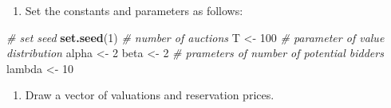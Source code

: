 \documentclass[
]{book}
\newenvironment{Shaded}{\begin{snugshade}}{\end{snugshade}}
\newcommand{\CommentTok}[1]{\textcolor[rgb]{0.56,0.35,0.01}{\textit{#1}}}
\newcommand{\DecValTok}[1]{\textcolor[rgb]{0.00,0.00,0.81}{#1}}
\newcommand{\FunctionTok}[1]{\textcolor[rgb]{0.13,0.29,0.53}{\textbf{#1}}}
\newcommand{\NormalTok}[1]{#1}
\newcommand{\OtherTok}[1]{\textcolor[rgb]{0.56,0.35,0.01}{#1}}
\providecommand{\tightlist}{%
  \setlength{\itemsep}{0pt}\setlength{\parskip}{0pt}}
\begin{document}
\begin{enumerate}
\def\labelenumi{\arabic{enumi}.}
\tightlist
\item
  Set the constants and parameters as follows:
\end{enumerate}

\begin{Shaded}
\begin{Highlighting}[]
\CommentTok{\# set seed}
\FunctionTok{set.seed}\NormalTok{(}\DecValTok{1}\NormalTok{)}
\CommentTok{\# number of auctions}
\NormalTok{T }\OtherTok{\textless{}{-}} \DecValTok{100}
\CommentTok{\# parameter of value distribution}
\NormalTok{alpha }\OtherTok{\textless{}{-}} \DecValTok{2}
\NormalTok{beta }\OtherTok{\textless{}{-}} \DecValTok{2}
\CommentTok{\# prameters of number of potential bidders}
\NormalTok{lambda }\OtherTok{\textless{}{-}} \DecValTok{10}
\end{Highlighting}
\end{Shaded}

\begin{enumerate}
\def\labelenumi{\arabic{enumi}.}
\setcounter{enumi}{1}
\tightlist
\item
  Draw a vector of valuations and reservation prices.
\end{enumerate}
\end{document}
